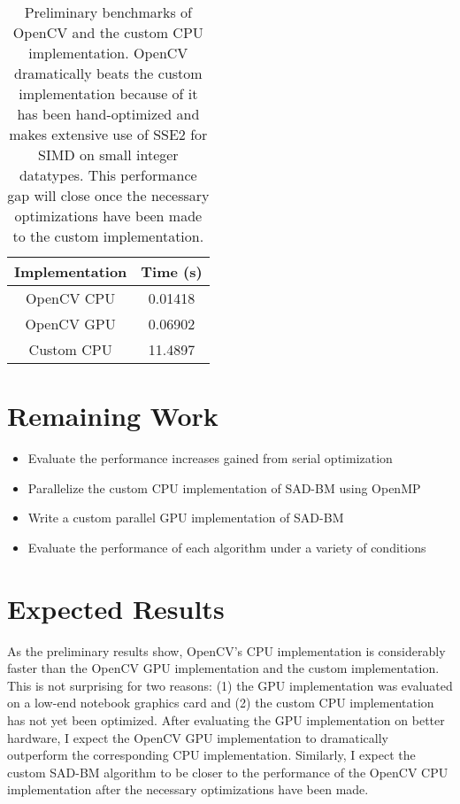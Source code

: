 \documentclass{article}
\begin{document}
\begin{table}
	\centering
	\begin{tabular}{|c|c|}
	\hline
	Implementation & Time (s) \\
	\hline
	OpenCV CPU & 0.01418 \\
	OpenCV GPU & 0.06902 \\
	Custom CPU & 11.4897 \\
	\hline
	\end{tabular}
	\caption{
		Preliminary benchmarks of OpenCV and the custom CPU implementation. OpenCV
		dramatically beats the custom implementation because of it has been
		hand-optimized and makes extensive use of SSE2 for SIMD on small integer
		datatypes. This performance gap will close once the necessary optimizations
		have been made to the custom implementation.
	}
\end{table}

\section{Remaining Work}
\begin{itemize}
\item Evaluate the performance increases gained from serial optimization
\item Parallelize the custom CPU implementation of SAD-BM using OpenMP
\item Write a custom parallel GPU implementation of SAD-BM
\item Evaluate the performance of each algorithm under a variety of conditions
\end{itemize}

\section{Expected Results}
As the preliminary results show, OpenCV's CPU implementation is considerably
faster than the OpenCV GPU implementation and the custom implementation. This
is not surprising for two reasons: (1) the GPU implementation was evaluated on
a low-end notebook graphics card and (2) the custom CPU implementation has not
yet been optimized. After evaluating the GPU implementation on better hardware,
I expect the OpenCV GPU implementation to dramatically outperform the
corresponding CPU implementation. Similarly, I expect the custom SAD-BM
algorithm to be closer to the performance of the OpenCV CPU implementation
after the necessary optimizations have been made.
\end{document}
